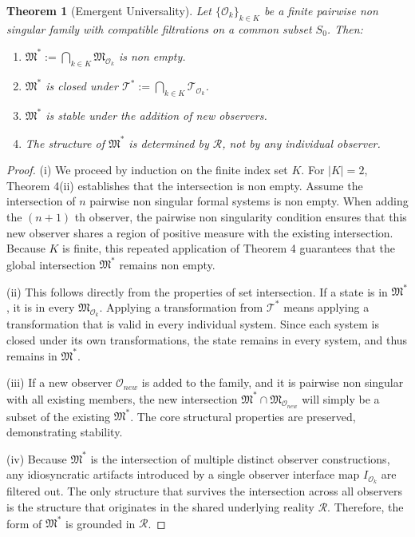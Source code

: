 \documentclass[12pt]{article}
\newtheorem{theorem}{Theorem}
\theoremstyle{definition}
\begin{document}
\begin{theorem}[Emergent Universality]
Let $\{\mathcal{O}_k\}_{k \in K}$ be a finite pairwise non singular family with compatible filtrations on a common subset $S_0$. Then:
\begin{enumerate}[label=(\roman*)]
    \item $\mathfrak{M}^* := \bigcap_{k \in K} \mathfrak{M}_{\mathcal{O}_k}$ is non empty.
    \item $\mathfrak{M}^*$ is closed under $\mathcal{T}^* := \bigcap_{k \in K} \mathcal{T}_{\mathcal{O}_k}$.
    \item $\mathfrak{M}^*$ is stable under the addition of new observers.
    \item The structure of $\mathfrak{M}^*$ is determined by $\mathcal{R}$, not by any individual observer.
\end{enumerate}
\end{theorem}
\begin{proof}
(i) We proceed by induction on the finite index set $K$. For $|K| = 2$, Theorem 4(ii) establishes that the intersection is non empty. Assume the intersection of $n$ pairwise non singular formal systems is non empty. When adding the $(n+1)$ th observer, the pairwise non singularity condition ensures that this new observer shares a region of positive measure with the existing intersection. Because $K$ is finite, this repeated application of Theorem 4 guarantees that the global intersection $\mathfrak{M}^*$ remains non empty.

(ii) This follows directly from the properties of set intersection. If a state is in $\mathfrak{M}^*$, it is in every $\mathfrak{M}_{\mathcal{O}_k}$. Applying a transformation from $\mathcal{T}^*$ means applying a transformation that is valid in every individual system. Since each system is closed under its own transformations, the state remains in every system, and thus remains in $\mathfrak{M}^*$.

(iii) If a new observer $\mathcal{O}_{new}$ is added to the family, and it is pairwise non singular with all existing members, the new intersection $\mathfrak{M}^* \cap \mathfrak{M}_{\mathcal{O}_{new}}$ will simply be a subset of the existing $\mathfrak{M}^*$. The core structural properties are preserved, demonstrating stability.

(iv) Because $\mathfrak{M}^*$ is the intersection of multiple distinct observer constructions, any idiosyncratic artifacts introduced by a single observer interface map $I_{\mathcal{O}_k}$ are filtered out. The only structure that survives the intersection across all observers is the structure that originates in the shared underlying reality $\mathcal{R}$. Therefore, the form of $\mathfrak{M}^*$ is grounded in $\mathcal{R}$.
\end{proof}
\end{document}
